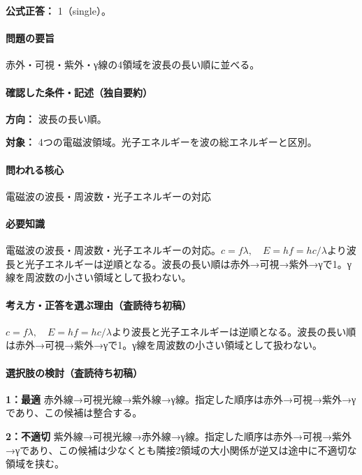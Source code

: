 \textbf{公式正答：} 1（single）。

\paragraph{問題の要旨} 赤外・可視・紫外・γ線の4領域を波長の長い順に並べる。

\paragraph{確認した条件・記述（独自要約）}\mbox{}\par

\noindent\textbf{方向：} 波長の長い順。\par

\noindent\textbf{対象：} 4つの電磁波領域。光子エネルギーを波の総エネルギーと区別。\par

\paragraph{問われる核心} 電磁波の波長・周波数・光子エネルギーの対応

\paragraph{必要知識} 電磁波の波長・周波数・光子エネルギーの対応。\(c=f\lambda,\quad E=hf=hc/\lambda\)より波長と光子エネルギーは逆順となる。波長の長い順は赤外→可視→紫外→γで1。γ線を周波数の小さい領域として扱わない。

\paragraph{考え方・正答を選ぶ理由（査読待ち初稿）} \(c=f\lambda,\quad E=hf=hc/\lambda\)より波長と光子エネルギーは逆順となる。波長の長い順は赤外→可視→紫外→γで1。γ線を周波数の小さい領域として扱わない。

\paragraph{選択肢の検討（査読待ち初稿）}\mbox{}\par

\noindent\textbf{1：最適} 赤外線→可視光線→紫外線→γ線。指定した順序は赤外→可視→紫外→γであり、この候補は整合する。\par

\noindent\textbf{2：不適切} 紫外線→可視光線→赤外線→γ線。指定した順序は赤外→可視→紫外→γであり、この候補は少なくとも隣接2領域の大小関係が逆又は途中に不適切な領域を挟む。\par

